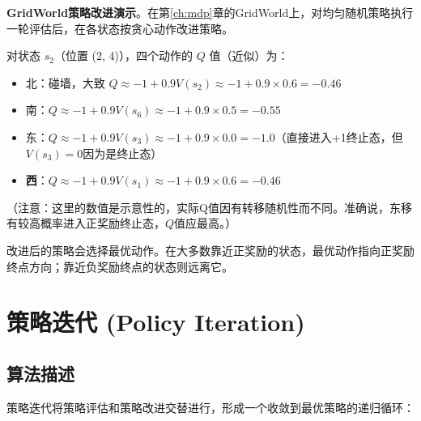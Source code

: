 \begin{example}
\textbf{GridWorld策略改进演示}。在第\ref{ch:mdp}章的GridWorld上，对均匀随机策略执行一轮评估后，在各状态按贪心动作改进策略。

对状态 $s_2$（位置 (2, 4)），四个动作的 $Q$ 值（近似）为：
\begin{itemize}
    \item 北：碰墙，大致 $Q \approx -1 + 0.9 V(s_2) \approx -1 + 0.9 \times 0.6 = -0.46$
    \item 南：$Q \approx -1 + 0.9 V(s_6) \approx -1 + 0.9 \times 0.5 = -0.55$
    \item 东：$Q \approx -1 + 0.9 V(s_3) \approx -1 + 0.9 \times 0.0 = -1.0$（直接进入+1终止态，但$V(s_3)=0$因为是终止态）
    \item \textbf{西}：$Q \approx -1 + 0.9 V(s_1) \approx -1 + 0.9 \times 0.6 = -0.46$
\end{itemize}
（注意：这里的数值是示意性的，实际Q值因有转移随机性而不同。准确说，东移有较高概率进入正奖励终止态，$Q$值应最高。）

改进后的策略会选择最优动作。在大多数靠近正奖励的状态，最优动作指向正奖励终点方向；靠近负奖励终点的状态则远离它。
\end{example}

\section{策略迭代 (Policy Iteration)}

\subsection{算法描述}

策略迭代将策略评估和策略改进交替进行，形成一个收敛到最优策略的递归循环：

